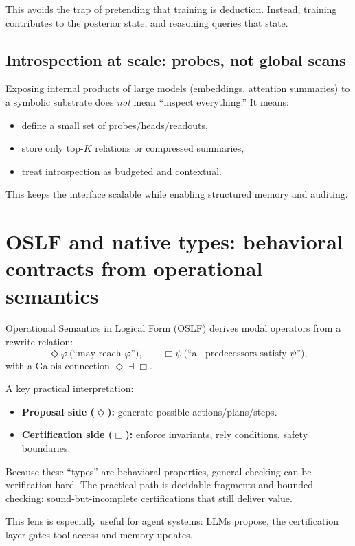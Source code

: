 \documentclass[11pt]{article}
\begin{document}
This avoids the trap of pretending that training is deduction.
Instead, training contributes to the posterior state, and reasoning queries that state.

\subsection{Introspection at scale: probes, not global scans}

Exposing internal products of large models (embeddings, attention summaries) to a symbolic substrate does \emph{not}
mean ``inspect everything.'' It means:
\begin{itemize}[leftmargin=2em]
\item define a small set of probes/heads/readouts,
\item store only top-$K$ relations or compressed summaries,
\item treat introspection as budgeted and contextual.
\end{itemize}

This keeps the interface scalable while enabling structured memory and auditing.

\section{OSLF and native types: behavioral contracts from operational semantics}

Operational Semantics in Logical Form (OSLF) derives modal operators from a rewrite relation:
\[
\Diamond \varphi\ \text{(``may reach $\varphi$'')},\qquad
\Box \psi\ \text{(``all predecessors satisfy $\psi$'')},
\]
with a Galois connection $\Diamond \dashv \Box$.

A key practical interpretation:
\begin{itemize}[leftmargin=2em]
\item \textbf{Proposal side ($\Diamond$):} generate possible actions/plans/steps.
\item \textbf{Certification side ($\Box$):} enforce invariants, rely conditions, safety boundaries.
\end{itemize}

Because these ``types'' are behavioral properties, general checking can be verification-hard.
The practical path is decidable fragments and bounded checking: sound-but-incomplete certifications that still deliver value.

This lens is especially useful for agent systems:
LLMs propose, the certification layer gates tool access and memory updates.
\end{document}
